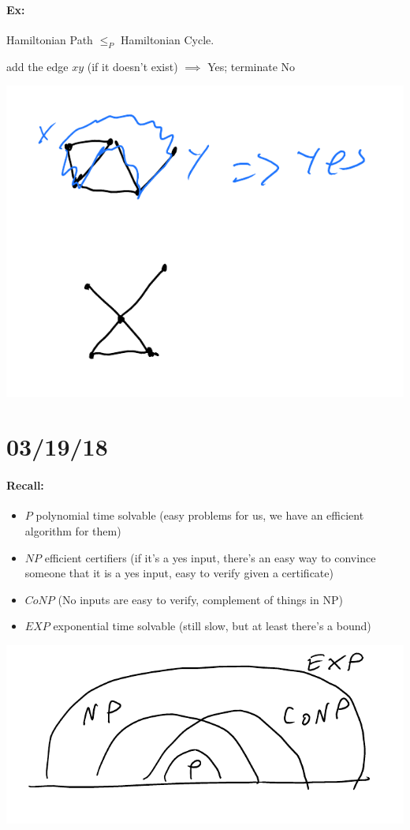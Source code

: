 \documentclass[12 pt]{article}
\begin{document}
          \paragraph{Ex:} Hamiltonian Path $\leq_P$ Hamiltonian Cycle.
          \begin{algorithmic}
                \State add the edge $xy$ (if it doesn't exist)
                 $\implies$
                Yes; terminate
                \EndIf
            \EndFor
            \State No
          \end{algorithmic}
          \includegraphics[width=.9\textwidth]{i123}
          \section{03/19/18}
          \paragraph{Recall:}
          \begin{itemize}
          \item $P$ polynomial time solvable (easy problems for us, we
            have an efficient algorithm for them)
          \item $NP$ efficient certifiers (if it's a yes input,
            there's an easy way to convince someone that it is a yes
            input, easy to verify given a certificate)
          \item $CoNP$ (No inputs are easy to verify, complement of
            things in NP)
          \item $EXP$ exponential time solvable (still slow, but at
            least there's a bound)
          \end{itemize}
          \includegraphics[width=.9\textwidth]{i119.pdf}
\end{document}

